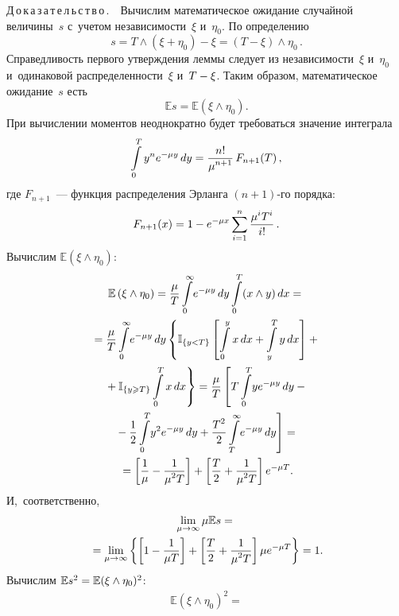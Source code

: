 \begin{multicols}{2}
\noindent
{Д\,о\,к\,а\,з\,а\,т\,е\,л\,ь\,с\,т\,в\,о\,.}\ \ 
Вычислим математическое ожидание случайной величины~$s$ с~учетом независимости~$\xi$ 
и~$\eta_0$. По определению
\begin{equation*}
s = T\wedge\left(\xi+\eta_0\right)-\xi = (T-\xi)\wedge\eta_0\,.
\end{equation*}
Справедливость первого утверждения леммы следует из независимости~$\xi$ и~$\eta_0$ 
и~одинаковой распределенности~$\xi$ и~$T\hm-\xi$. Таким образом, математическое 
ожидание~$s$ есть
\begin{equation*}
\mathbb{E}s  = \mathbb{E}\left(\xi\wedge\eta_0\right).
\end{equation*}
При вычислении моментов неоднократно будет требоваться значение интеграла
\begin{equation*}
\int\limits_{0}^{{T}}y^ne^{-\mu y}\,dy = \displaystyle\frac{\displaystyle n!\mathstrut}{\displaystyle \mu^{n+1}\mathstrut}\,F_{n+1}(T)\,,
\end{equation*}
где $F_{n+1}$~--- 
функция распределения Эрланга $(n+1)$-го порядка:
$$
F_{n+1}(x) = 1 - e^{-\mu x}\sum\limits_{i=1}^{n}\displaystyle\frac{\displaystyle \mu^iT^i\mathstrut}{\displaystyle i!\mathstrut}\,.
$$ 
Вычислим 
$\mathbb{E}(\xi\wedge\eta_0)$:
\begin{multline*}
\mathbb{E}\left(\xi\wedge\eta_0\right) =
\displaystyle\frac{\displaystyle \mu\mathstrut}{\displaystyle T\mathstrut}\int\limits_{0}^{\infty}\!e^{-\mu y}\,dy\int\limits_{0}^{T}(x\wedge y)\,dx 
 ={}\\
 {}=\displaystyle\frac{\displaystyle \mu\mathstrut}{\displaystyle T\mathstrut}\int\limits_{0}^{\infty}\!e^{-\mu y}\,dy\left\{
 \mathbb{I}_{\{y<T\}}\left[\int\limits_{0}^{y}x\,dx+
 \int\limits_{y}^{T}y\,dx\right] + {}\right.\\
\left. {}+
 \mathbb{I}_{\{y\geqslant T\}}\int\limits_{0}^{T}x\,dx\right\} = \displaystyle\frac{\displaystyle \mu\mathstrut}{\displaystyle T\mathstrut}\left[T\int\limits_{0}^{T}\!ye^{-\mu y}\,dy -{}\right.\\
\left.{}-
\displaystyle\frac{\displaystyle 1\mathstrut}{\displaystyle 2\mathstrut}\int\limits_{0}^{T}\!y^2e^{-\mu y}\,dy + 
\displaystyle\frac{\displaystyle T^2\mathstrut}{\displaystyle 2\mathstrut}\int\limits_{T}^{\infty}\!e^{-\mu y}\,dy \right]={} \\
{}=\left[\displaystyle\frac{\displaystyle 1\mathstrut}{\displaystyle \mu\mathstrut}-\displaystyle\frac{\displaystyle 1\mathstrut}{\displaystyle \mu^2 T\mathstrut}\right]+\left[\displaystyle\frac{\displaystyle T\mathstrut}{\displaystyle 2\mathstrut}+\displaystyle\frac{\displaystyle 1\mathstrut}{\displaystyle \mu^2 T\mathstrut}\right]
e^{-\mu T}.
\end{multline*}
И,~соответственно,
\begin{multline*}
\lim\limits_{\mu \rightarrow \infty}\mu\mathbb{E}s ={}\\
{}= 
\lim\limits_{\mu \rightarrow \infty}\left\{\left[1-\displaystyle\frac{\displaystyle 1\mathstrut}{\displaystyle \mu T\mathstrut}\right]+
\left[\displaystyle\frac{\displaystyle T\mathstrut}{\displaystyle 2\mathstrut}+\displaystyle\frac{\displaystyle 1\mathstrut}{\displaystyle \mu^2 T\mathstrut}\right]\mu e^{-\mu T}\right\}=1. 
\end{multline*}
Вычислим $\mathbb{E}s^2\hm=\mathbb{E}(\xi\wedge\eta_0)^2$:
\begin{multline*}
\mathbb{E}\left(\xi\wedge\eta_0\right)^2=

\end{multline*}
\end{multicols}
